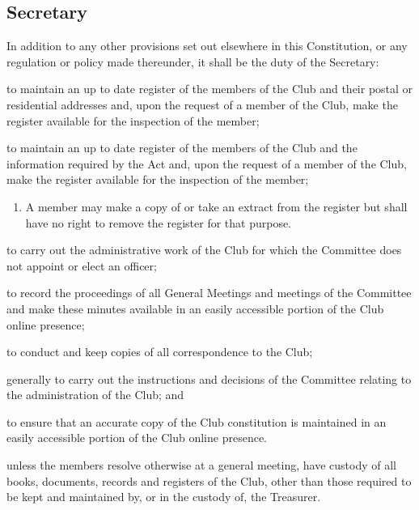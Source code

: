 \documentclass[11pt]{article} %
\begin{document}
\subsection{Secretary}
In addition to any other provisions set out elsewhere in this Constitution, or any regulation or policy made thereunder, it shall be the duty of the Secretary:
\begin{enumerate}

	{\color{red} \item to maintain an up to date register of the members of the Club and their postal or residential addresses and, upon the request of a member of the Club, make the register available for the inspection of the member;}
	{\color{ForestGreen} \item to maintain an up to date register of the members of the Club and the information required by the Act and, upon the request of a member of the Club, make the register available for the inspection of the member;}
	\begin{enumerate}[1.]
			\item A member may make a copy of or take an extract from the register but shall have no right to remove the register for that purpose.
		\end{enumerate}
	\item to carry out the administrative work of the Club for which the Committee does not appoint or elect an officer;
	\item to record the proceedings of all General Meetings and meetings of the Committee and make these minutes available in an easily accessible portion of the Club online presence;
	\item to conduct and keep copies of all correspondence to the Club;
	\item generally to carry out the instructions and decisions of the Committee relating to the administration of the Club; and
	\item to ensure that an accurate copy of the Club constitution is maintained in an easily accessible portion of the Club online presence.
	\item unless the members resolve otherwise at a general meeting, have custody of all books, documents, records and registers of the Club, other than those required to be kept and maintained by, or in the custody of, the Treasurer.
\end{enumerate}
\end{document}
